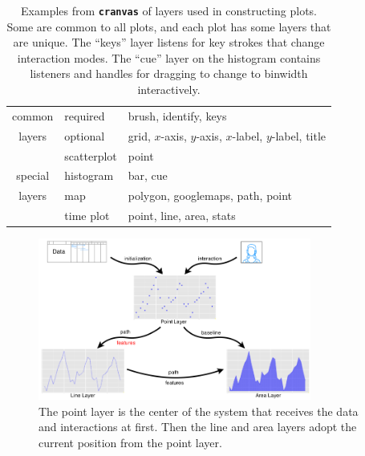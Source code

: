 \documentclass[12pt]{article}
\providecommand{\tabularnewline}{\\}
\begin{document}
\begin{center}
\begin{table}[h]
\begin{centering}
\begin{tabular}{c|l|l}
\hline 
common & required & brush, identify, keys\tabularnewline
\cline{2-3} 
layers & optional & grid, $x$-axis, $y$-axis, $x$-label, $y$-label, title \tabularnewline
\hline 
 & scatterplot & point\tabularnewline
\cline{2-3} 
special & histogram & bar, cue\tabularnewline
\cline{2-3} 
layers & map & polygon, googlemaps, path, point\tabularnewline
\cline{2-3} 
 & time plot & point, line, area, stats\tabularnewline
\hline 
\end{tabular}
\par\end{centering}

\caption{\label{tab:Layers}Examples from \texttt{\textbf{cranvas}} of layers used in constructing plots. Some are common to all plots, and each plot has some layers that are unique. The ``keys'' layer listens for key strokes that change interaction modes. The ``cue'' layer on the histogram contains listeners and handles for dragging to change to binwidth interactively.}
\end{table}

\par\end{center}


\begin{center}
\begin{figure}[H]
\begin{centering}
\includegraphics[width=0.8\textwidth]{graph/pipeline-12-threelayers}
\par\end{centering}

\caption{\label{fig:layer-system}The point layer is the center of the system that receives the data and interactions at first. Then the line and area layers adopt the current position from the point layer.}
\end{figure}

\par\end{center}
\end{document}
